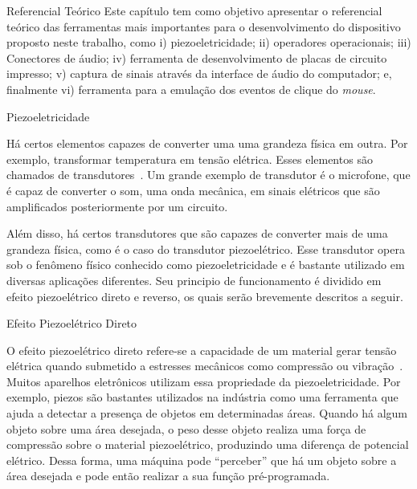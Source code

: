\begin{chapter}{Referencial Teórico}
Este capítulo tem como objetivo apresentar o referencial teórico das ferramentas
mais importantes para o desenvolvimento do dispositivo proposto neste trabalho,
como i) piezoeletricidade; ii) operadores operacionais; iii) Conectores de
áudio; iv) ferramenta de desenvolvimento de placas de circuito impresso; v) captura de sinais
através da interface de áudio do computador; e, finalmente vi) ferramenta para a
emulação dos eventos de clique do \textit{mouse}.

\begin{section}{Piezoeletricidade}

Há certos elementos capazes de converter uma uma grandeza física em outra. Por
exemplo, transformar temperatura em tensão elétrica. Esses elementos são
chamados de transdutores~\cite{william}. Um grande exemplo de transdutor é o
microfone, que é capaz de converter o som, uma onda mecânica, em sinais
elétricos que são amplificados posteriormente por um circuito. %

Além disso, há certos transdutores que são capazes de converter mais de uma
grandeza física, como é o caso do transdutor piezoelétrico. Esse transdutor
opera sob o fenômeno físico conhecido como piezoeletricidade e é bastante
utilizado em diversas aplicações diferentes. Seu principio de funcionamento é
dividido em efeito piezoelétrico direto e reverso, os quais serão brevemente 
descritos a seguir.
  
\begin{subsection}{Efeito Piezoelétrico Direto}

O efeito piezoelétrico direto refere-se a capacidade de um material gerar tensão
elétrica quando submetido a estresses mecânicos como compressão ou
vibração~\cite{jaffe2012piezoelectric}. Muitos aparelhos eletrônicos utilizam
essa propriedade da piezoeletricidade. Por exemplo, piezos são bastantes
utilizados na indústria como uma ferramenta que ajuda a detectar a presença de
objetos em determinadas áreas. Quando há algum objeto sobre uma área desejada,
o peso desse objeto realiza uma força de compressão sobre o material
piezoelétrico, produzindo uma diferença de potencial elétrico. Dessa
forma, uma máquina pode ``perceber'' que há um objeto sobre a área desejada e
pode então realizar a sua função pré-programada. %
  

\end{subsection}
\end{section}
\end{chapter}
